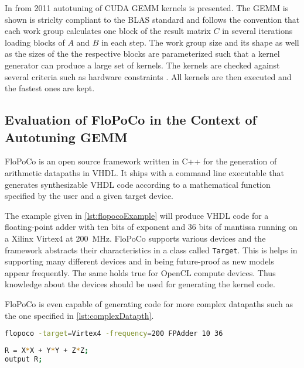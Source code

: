 In \cite{Kurzak2011} from 2011 autotuning of CUDA \ac{GEMM} kernels is 
presented. The \ac{GEMM} is shown is striclty compliant to the \ac{BLAS} 
standard and follows the convention that each work group calculates one block 
of the result matrix $C$ in several iterations loading blocks of $A$ and $B$ in 
each step. The work group size and its shape as well as the sizes of the the 
respective blocks are parameterized such that a kernel generator can produce a 
large set of kernels. The kernels are checked against several criteria such 
as hardware constraints \cite[Section 5.3]{Kurzak2011}. All kernels are then 
executed and the fastest ones are kept.


\subsection{Evaluation of \acs{FloPoCo} in the Context of Autotuning \acs{GEMM}}
\ac{FloPoCo} is an open source framework written in C++ for the generation of 
arithmetic datapaths in VHDL. It ships with a command line executable that 
generates synthesizable VHDL code according to a mathematical function specified 
by the user and a given target device.

The example given in \cref{lst:flopocoExample} will produce VHDL code for a
floating-point adder with ten bits of exponent and 36 bits of mantissa running 
on a Xilinx Virtex4 at \SI{200}{\mega\hertz}.
\ac{FloPoCo} supports various devices and the framework abstracts their 
characteristics in a class called \texttt{Target}. This is helps in supporting 
many different devices and in being future-proof as new models appear 
frequently. The same holds true for OpenCL compute devices. Thus knowledge 
about the devices should be used for generating the kernel code.

FloPoCo is even capable of generating code for more complex datapaths such as 
the one specified in \cref{lst:complexDatapth}.

\begin{lstlisting}[language=bash,caption={Exemplary invocation of the 
\acs{FloPoCo} code generator},label={lst:flopocoExample}]
flopoco -target=Virtex4 -frequency=200 FPAdder 10 36
\end{lstlisting}

\begin{lstlisting}[language=bash,caption={Pseudo program for a more complex 
datapath},label={lst:complexDatapth}]
R = X*X + Y*Y + Z*Z;
output R;
\end{lstlisting}

